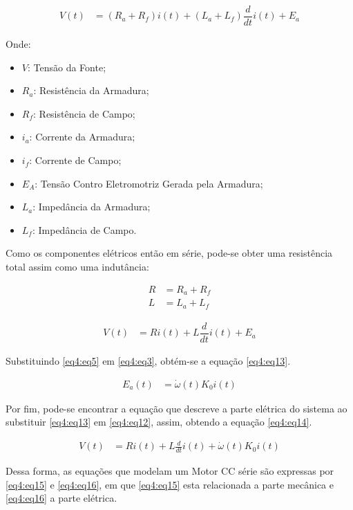 \begin{align}
	V(t) &= (R_a + R_f)i(t)+ (L_a + L_f)\dfrac{d}{dt}i(t) + E_a \label{eq4:eq9}
\end{align}

Onde:

\begin{itemize}
        \setlength{\itemsep}{-2pt}
	\item $V$: Tensão da Fonte;
	\item $R_a$: Resistência da Armadura;
	\item $R_f$: Resistência de Campo;
	\item $i_a$: Corrente da Armadura;
	\item $i_f$: Corrente de Campo;
	\item $E_A$: Tensão Contro Eletromotriz Gerada pela Armadura;
	\item $L_a$: Impedância da Armadura;
	\item $L_f$: Impedância de Campo.
\end{itemize}

Como os componentes elétricos então em série, pode-se obter uma resistência total assim como uma indutância:

\begin{align}
	R &= R_a + R_f          \label{eq4:eq10}\\        
	L &= L_a + L_f          \label{eq4:eq11}
\end{align}

\begin{align}
	V(t) &= Ri(t)+ L\dfrac{d}{dt}i(t) + E_a \label{eq4:eq12}
\end{align}

Substituindo \ref{eq4:eq5} em \ref{eq4:eq3}, obtém-se a equação \ref{eq4:eq13}.

\begin{align}
	E_a(t) &= \dot{\omega}(t)K_0 i(t) \label{eq4:eq13}
\end{align}

Por fim, pode-se encontrar a equação que descreve a parte elétrica do sistema ao substituir \ref{eq4:eq13} em \ref{eq4:eq12}, assim, obtendo a equação \ref{eq4:eq14}.

\begin{align}
	V(t) &= Ri(t)+ L\frac{d}{dt}i(t) + \dot{\omega}(t)K_0 i(t) \label{eq4:eq14}
\end{align}

Dessa forma, as equações que modelam um Motor CC série são expressas por \ref{eq4:eq15} e \ref{eq4:eq16}, em que \ref{eq4:eq15} esta relacionada a parte mecânica e \ref{eq4:eq16} a parte elétrica.

